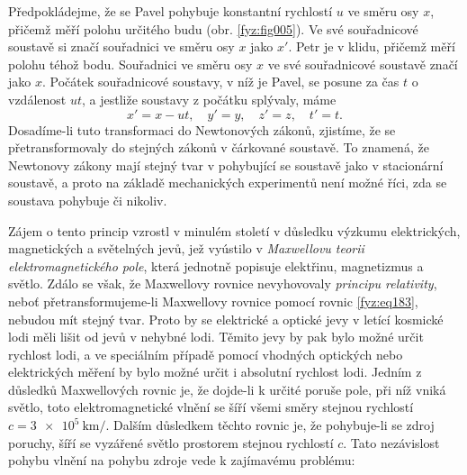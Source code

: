   
    Předpokládejme, že se Pavel pohybuje konstantní rychlostí \(u\) ve směru osy \(x\), přičemž měří
    polohu určitého budu (obr. \ref{fyz:fig005}). Ve své souřadnicové soustavě si značí souřadnici
    ve směru osy \(x\) jako \(x'\). Petr je v klidu, přičemž měří polohu téhož bodu. Souřadnici ve
    směru osy \(x\) ve své souřadnicové soustavě značí jako \(x\). Počátek souřadnicové soustavy, v
    níž je Pavel, se posune za čas \(t\) o vzdálenost \(ut\), a jestliže soustavy z počátku
    splývaly, máme
    \begin{equation}\label{fyz:eq183}
      x' = x - ut, \quad y' = y, \quad z' = z, \quad t' = t. 
    \end{equation}
    Dosadíme-li tuto transformaci do Newtonových zákonů, zjistíme, že se přetransformovaly do
    stejných zákonů v čárkované soustavě. To znamená, že Newtonovy zákony mají stejný tvar v
    pohybující se soustavě jako v stacionární soustavě, a proto na základě mechanických experimentů
    není možné říci, zda se soustava pohybuje či nikoliv. 
    
    Zájem o tento princip vzrostl v minulém století v důsledku výzkumu elektrických, magnetických a
    světelných jevů, jež vyústilo v \emph{Maxwellovu teorii elektromagnetického pole}, která
    jednotně popisuje elektřinu, magnetizmus a světlo. Zdálo se však, že Maxwellovy rovnice
    nevyhovovaly \emph{principu relativity}, neboť přetransformujeme-li Maxwellovy rovnice pomocí
    rovnic \ref{fyz:eq183}, nebudou mít stejný tvar. Proto by se elektrické a optické jevy v letící
    kosmické lodi měli lišit od jevů v nehybné lodi. Těmito jevy by pak bylo možné určit rychlost
    lodi, a ve speciálním případě pomocí vhodných optických nebo elektrických měření by bylo možné
    určit i absolutní rychlost lodi. Jedním z důsledků Maxwellových rovnic je, že dojde-li k určité
    poruše pole, při níž vniká světlo, toto elektromagnetické vlnění se šíří všemi směry stejnou
    rychlostí \(c = \SI{3e5}{\km\per}\). Dalším důsledkem těchto rovnic je, že pohybuje-li se zdroj
    poruchy, šíří se vyzářené světlo prostorem stejnou rychlostí \(c\). Tato nezávislost pohybu
    vlnění na pohybu zdroje vede k zajímavému problému:
    
